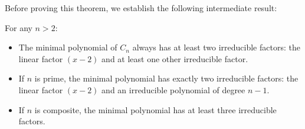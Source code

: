 Before proving this theorem, we establish the following intermediate result:

\begin{proposition}\label{prop:factors}
For any $n > 2$:
\begin{itemize}
\item The minimal polynomial of $C_n$ always has at least two irreducible factors: the linear factor $(x-2)$ and at least one other irreducible factor.
\item If $n$ is prime, the minimal polynomial has exactly two irreducible factors: the linear factor $(x-2)$ and an irreducible polynomial of degree $n-1$.
\item If $n$ is composite, the minimal polynomial has at least three irreducible factors.
\end{itemize}
\end{proposition}

